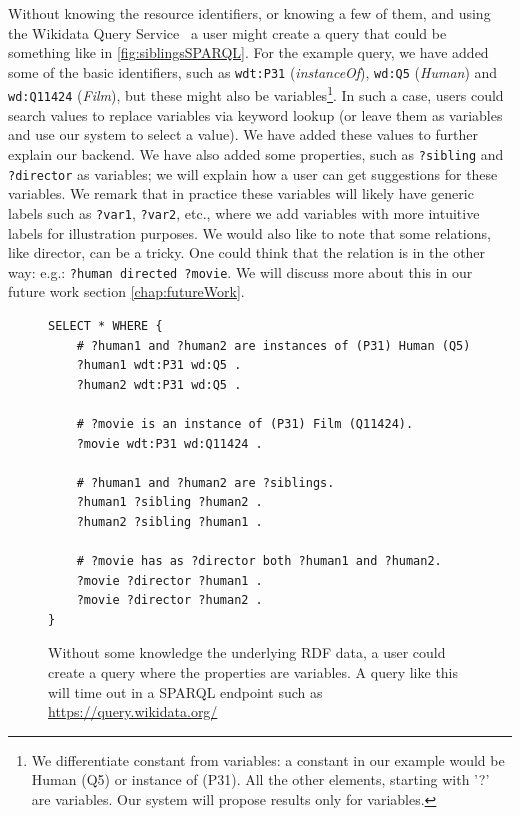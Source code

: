 Without knowing the resource identifiers, or knowing a few of them, and using the Wikidata Query Service~\cite{wikidataQueryService} a user might create a query that could be something like in \autoref{fig:siblingsSPARQL}. 
For the example query, we have added some of the basic identifiers, such as \texttt{wdt:P31} (\textit{instanceOf}), \texttt{wd:Q5} (\textit{Human}) and \texttt{wd:Q11424} (\textit{Film}), but these might also be variables\footnote{We differentiate constant from variables: a constant in our example would be Human (Q5) or instance of (P31). All the other elements, starting with '?' are variables. Our system will propose results only for variables.}. 
In such a case, users could search values to replace variables via keyword lookup (or leave them as variables and use our system to select a value). 
We have added these values to further explain our backend. We have also added some properties, such as \texttt{?sibling} and \texttt{?director} as variables; we will explain how a user can get suggestions for these variables.
We remark that in practice these variables will likely have generic labels such as \texttt{?var1}, \texttt{?var2}, etc., where we add variables with more intuitive labels for illustration purposes. 
We would also like to note that some relations, like director, can be a tricky. One could think that the relation is in the other way: e.g.: \texttt{?human directed ?movie}. We will discuss more about this in our future work section \autoref{chap:futureWork}.

\begin{figure}[H]
\begin{verbatim}
SELECT * WHERE {
    # ?human1 and ?human2 are instances of (P31) Human (Q5)
    ?human1 wdt:P31 wd:Q5 .
    ?human2 wdt:P31 wd:Q5 .
    
    # ?movie is an instance of (P31) Film (Q11424).
    ?movie wdt:P31 wd:Q11424 .
    
    # ?human1 and ?human2 are ?siblings.
    ?human1 ?sibling ?human2 .
    ?human2 ?sibling ?human1 .
    
    # ?movie has as ?director both ?human1 and ?human2.
    ?movie ?director ?human1 .
    ?movie ?director ?human2 .
}
\end{verbatim}
\caption{Without some knowledge the underlying RDF data, a user could create a query where the properties are variables. A query like this will time out in a SPARQL endpoint such as \url{https://query.wikidata.org/}}
\label{fig:siblingsSPARQL}
\end{figure}

